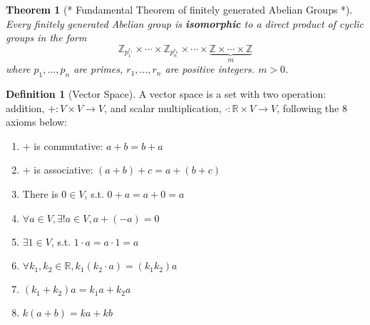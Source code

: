 \documentclass{article}
\theoremstyle{MyNonumberplain}
\theoremstyle{break}
\theoremstyle{break}
\newtheorem{theorem}{Theorem}[section]
\theoremstyle{break}
\theoremstyle{definition}
\theoremstyle{break}
\newtheorem{definition}{Definition}[section]
\begin{document}
\begin{thmbox}
    \begin{theorem}[* Fundamental Theorem of finitely generated Abelian Groups *]
        Every finitely generated Abelian group is {\textbf{isomorphic}} to a direct
        product of cyclic groups in the form
        \[ \mathbb{Z}_{p_1^{r_1}} \times \cdots \times \mathbb{Z}_{p_n^{r_n}} \times
        \cdots \times {\underbrace{\mathbb{Z} \times \cdots \times
        \mathbb{Z}}_{m}} \]
        where $p_1, \ldots, p_n$ are primes, $r_1, \ldots, r_n$ are positive integers.
        $m > 0$. 
    \end{theorem}
\end{thmbox}

\begin{defbox}
    \begin{definition}[Vector Space]
        A vector space is a set with two operation: addition, $+ : V \times V
        \rightarrow V$, and scalar multiplication, $\cdot : \mathbb{R} \times V
        \rightarrow V$, following the 8 axioms below:\\
        \begin{enumerate}
        \item $+$ is commutative: $a + b = b + a$\\
        
        \item $+$ is associative: $(a + b) + c = a + (b + c)$\\
        
        \item There is $0 \in V$, s.t. $0 + a = a + 0 = a$\\
        
        \item $\forall a \in V, \exists !a \in V, a + (- a) = 0$\\
        
        \item $\exists 1 \in V$, s.t. $1 \cdot a = a \cdot 1 = a$\\
        
        \item $\forall k_1, k_2 \in \mathbb{R}, k_1 (k_2 \cdot a) = (k_1 k_2) a$\\
        
        \item $(k_1 + k_2) a = k_1 a + k_2 a$\\
        
        \item $k (a + b) = k a + k b$
        \end{enumerate}
    \end{definition}
\end{defbox}
\end{document}
